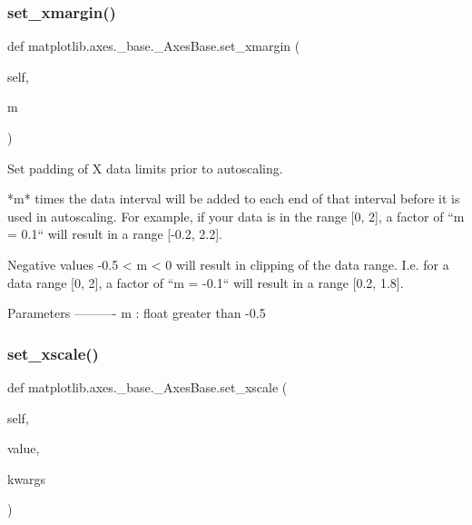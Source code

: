 \subsubsection{\texorpdfstring{set\+\_\+xmargin()}{set\_xmargin()}}
{\footnotesize\ttfamily def matplotlib.\+axes.\+\_\+base.\+\_\+\+Axes\+Base.\+set\+\_\+xmargin (\begin{DoxyParamCaption}\item[{}]{self,  }\item[{}]{m }\end{DoxyParamCaption})}

\begin{DoxyVerb}Set padding of X data limits prior to autoscaling.

*m* times the data interval will be added to each
end of that interval before it is used in autoscaling.
For example, if your data is in the range [0, 2], a factor of
``m = 0.1`` will result in a range [-0.2, 2.2].

Negative values -0.5 < m < 0 will result in clipping of the data range.
I.e. for a data range [0, 2], a factor of ``m = -0.1`` will result in
a range [0.2, 1.8].

Parameters
----------
m : float greater than -0.5
\end{DoxyVerb}
 \mbox{\label{classmatplotlib_1_1axes_1_1__base_1_1__AxesBase_a9f16b52c694472174cbae516b78bc1c7}} 
\subsubsection{\texorpdfstring{set\+\_\+xscale()}{set\_xscale()}}
{\footnotesize\ttfamily def matplotlib.\+axes.\+\_\+base.\+\_\+\+Axes\+Base.\+set\+\_\+xscale (\begin{DoxyParamCaption}\item[{}]{self,  }\item[{}]{value,  }\item[{}]{kwargs }\end{DoxyParamCaption})}

